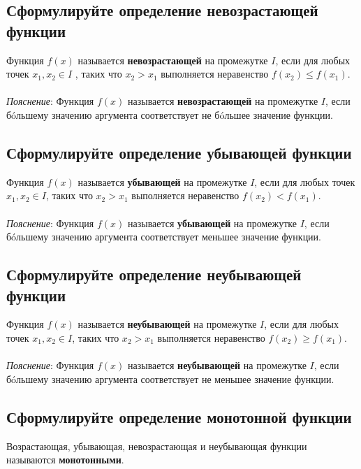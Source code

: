 \subsection{Сформулируйте определение невозрастающей функции}
\begin{definition}
	Функция $f(x)$ называется \textbf{невозрастающей} на промежутке $I$, если для любых точек $x_1, x_2 \in I$ , таких что $x_2 > x_1$ выполняется неравенство $f(x_2) \le f(x_1)$. \\\\
	\textit{Пояснение}: Функция $f ( x )$ называется \textbf{невозрастающей} на промежутке $I$,
	если\\ 
    бóльшему значению аргумента соответствует не бóльшее значение функции.
\end{definition}

\subsection{Сформулируйте определение убывающей функции}
\begin{definition}
Функция $f(x)$ называется \textbf{убывающей} на промежутке $I$, если для любых точек $x_1, x_2 \in I$, таких что $x_2 > x_1$ выполняется неравенство $f(x_2) < f(x_1)$.\\\\
\textit{Пояснение}: Функция $f(x)$ называется \textbf{убывающей} на промежутке $I$, если бóльшему значению аргумента соответствует меньшее значение функции.
\end{definition}
\newpage
\subsection{Сформулируйте определение неубывающей функции}
\begin{definition}
    Функция $f(x)$ называется \textbf{неубывающей} на промежутке $I$, если для любых точек $x_1, x_2 \in I$, таких что $x_2 > x_1$ выполняется неравенство $f(x_2) \ge f(x_1)$.\\\\
    \textit{Пояснение}: Функция $f(x)$ называется \textbf{неубывающей} на промежутке $I$, если бóльшему значению аргумента соответствует не меньшее значение функции.
\end{definition}

\subsection{Сформулируйте определение монотонной функции}
\begin{definition}
    Возрастающая, убывающая, невозрастающая и неубывающая функции называются \textbf{монотонными}.
\end{definition}

